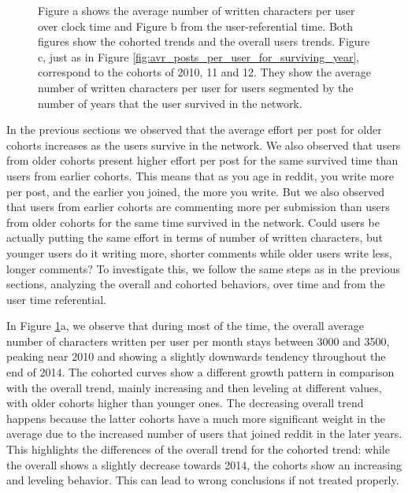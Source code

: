 \begin{figure}[!tb]
\begin{subfigure}{1\textwidth}
\caption{}\end{subfigure}
\caption{Figure a shows the average number of written characters per user over clock time and Figure b from the user-referential time. Both figures show the cohorted trends and the overall users trends. Figure c, just as in Figure \ref{fig:avr_posts_per_user_for_surviving_year}, correspond to the cohorts of 2010, 11 and 12. They show the average number of written characters per user for users segmented by the number of years that the user survived in the network.}
\label{fig:chars_users}
\end{figure}

In the previous sections we observed that the average effort per post for older cohorts increases as the users survive in the network. We also observed that users from older cohorts present higher effort per post for the same survived time than users from earlier cohorts. This means that as you age in reddit, you write more per post, and the earlier you joined, the more you write. But we also observed that users from earlier cohorts are commenting more per submission than users from older cohorts for the same time survived in the network. Could users be actually putting the same effort in terms of number of written characters, but younger users do it writing more, shorter comments while older users write less, longer comments? To investigate this, we follow the same steps as in the previous sections, analyzing the overall and cohorted behaviors, over time and from the user time referential.


In Figure \ref{fig:chars_users}a, we observe that during most of the time, the overall average number of characters written per user per month stays between 3000 and 3500, peaking near 2010 and showing a slightly downwards tendency throughout the end of 2014. The cohorted curves show a different growth pattern in comparison with the overall trend, mainly increasing and then leveling at different values, with older cohorts higher than younger ones. The decreasing overall trend happens because the latter cohorts have a much more significant weight in the average due to the increased number of users that joined reddit in the later years. This highlights the differences of the overall trend for the cohorted trend: while the overall shows a slightly decrease towards 2014, the cohorts show an increasing and leveling behavior. This can lead to wrong conclusions if not treated properly.

